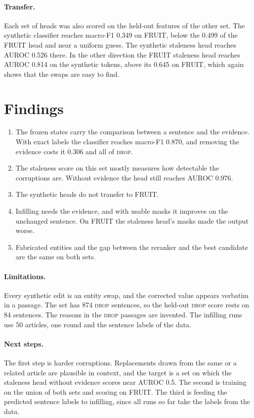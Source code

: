 \documentclass[]{paper}
\newcommand{\drop}{\textsc{drop}}
\begin{document}
\paragraph{Transfer.} Each set of heads was also scored on the held-out features of the other set. The synthetic classifier reaches macro-F1 0.349 on FRUIT, below the 0.499 of the FRUIT head and near a uniform guess. The synthetic staleness head reaches AUROC 0.526 there. In the other direction the FRUIT staleness head reaches AUROC 0.814 on the synthetic tokens, above its 0.645 on FRUIT, which again shows that the swaps are easy to find.

\section{Findings}
\label{sec:findings}

\begin{enumerate}
\item The frozen states carry the comparison between a sentence and the evidence. With exact labels the classifier reaches macro-F1 0.870, and removing the evidence costs it 0.306 and all of \drop{}.
\item The staleness score on this set mostly measures how detectable the corruptions are. Without evidence the head still reaches AUROC 0.976.
\item The synthetic heads do not transfer to FRUIT.
\item Infilling needs the evidence, and with usable masks it improves on the unchanged sentence. On FRUIT the staleness head's masks made the output worse.
\item Fabricated entities and the gap between the reranker and the best candidate are the same on both sets.
\end{enumerate}

\paragraph{Limitations.} Every synthetic edit is an entity swap, and the corrected value appears verbatim in a passage. The set has 874 \drop{} sentences, so the held-out \drop{} score rests on 84 sentences. The reasons in the \drop{} passages are invented. The infilling runs use 50 articles, one round and the sentence labels of the data.

\paragraph{Next steps.} The first step is harder corruptions. Replacements drawn from the same or a related article are plausible in context, and the target is a set on which the staleness head without evidence scores near AUROC 0.5. The second is training on the union of both sets and scoring on FRUIT. The third is feeding the predicted sentence labels to infilling, since all runs so far take the labels from the data.
\end{document}
